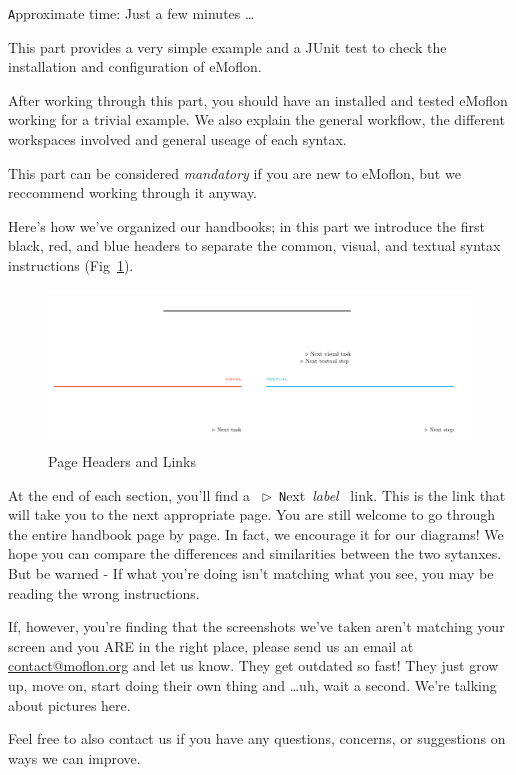 \genHeader
{}
{\small \texttt Approximate time: Just a few minutes \ldots}

This part provides a very simple example and a JUnit test to check the installation and configuration of eMoflon.

After working through this part, you should have an installed and tested eMoflon working for a trivial example.
We also explain the general workflow, the different workspaces involved and general useage of each syntax.

This part can be considered \emph{mandatory} if you are new to eMoflon, but we reccommend working through it anyway.

Here's how we've organized our handbooks; in this part we introduce the first black, red, and blue headers to separate the common, visual, and textual syntax instructions (Fig~\ref{pageExamples}).

\begin{figure}[htbp]
	\centering
  \includegraphics[width=1\textwidth]{pageExamples}
	\caption{Page Headers and Links} 
	\label{pageExamples} 
\end{figure}

At the end of each section, you'll find a \mbox{ $\triangleright$ {\texttt Next {\emph{label}}} } link. This is the link that will take you to the next appropriate page. You are still welcome to go through the entire handbook page by page. In fact, we encourage it for our diagrams! We hope you can compare the differences and similarities between the two sytanxes. But be warned - If what you're doing isn't matching what you see, you may be reading the wrong instructions. 

\pagebreak

If, however, you're finding that the screenshots we've taken aren't matching your screen and you ARE in the right place, please send us an email at \href{mailto:contact@moflon.org}{contact@moflon.org} and let us know. They get outdated so fast! They just grow up, move on, start doing their own thing and \ldots uh, wait a second. We're talking about pictures here.

Feel free to also contact us if you have any questions, concerns, or suggestions on ways we can improve. 

\newpage